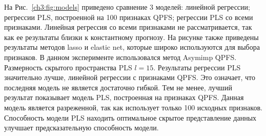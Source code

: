 На Рис.~\ref{ch3:fig:models} приведено сравнение 3 моделей: линейной регрессии; регрессии PLS, построенной на 100 признаках QPFS; регрессии PLS со всеми признаками.
Линейная регрессия со всеми признаками не рассматривается, так как ее результаты близки к константному прогнозу. На рисунке также приведены результаты методов lasso и elastic net, которые широко используются для выбора признаков.
В данном эксперименте использовался метод Asymimp QPFS.
Размерность скрытого пространства PLS $l = 15$.
Результаты регрессии PLS значительно лучше, линейной регрессии с признаками QPFS.
Это означает, что последняя модель не является достаточно гибкой.
Тем не менее, лучший результат показывает модель PLS, построенная на признаках QPFS. 
Данная модель является разреженной, так как использует только 100 исходных признаков.
Способность модели PLS находить оптимальное скрытое представление данных улучшает предсказательную способность модели.

